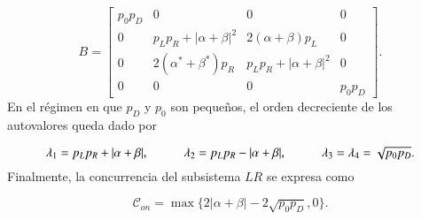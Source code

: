 \begin{appendixs}
\begin{equation*}
    B = 
    \begin{bmatrix}
        p_{0}p_{D} & 0 & 0 & 0  \\
        0 & p_{L}p_{R}+|\alpha+\beta|^{2} & 2(\alpha + \beta)p_{L} & 0  \\
        0 & 2(\alpha^{*} + \beta^{*})p_{R} & p_{L}p_{R}+|\alpha+\beta|^{2}  & 0  \\
        0 & 0 & 0 & p_{0}p_{D}
        \end{bmatrix}.
\end{equation*}
En el régimen en que $p_{D}$ y $p_{0}$ son pequeños, el orden decreciente de los autovalores queda dado por

\begin{equation*}
    \lambda_{1} = p_{L}p_{R} + |\alpha + \beta|, 
    \hspace{10mm}  
    \lambda_{2} = p_{L}p_{R} - |\alpha + \beta|, 
    \hspace{10mm}  
    \lambda_{3}=\lambda_{4} = \sqrt{p_{0}p_{D}}.
\end{equation*}
Finalmente, la concurrencia del subsistema $LR$ se expresa como

\begin{equation*}
    \mathcal{C}_{on} = \max\{ 2|\alpha+\beta| - 2\sqrt{p_{0}p_{D}},0\}.
\end{equation*}

\label{appendix5final}


\end{appendixs}
